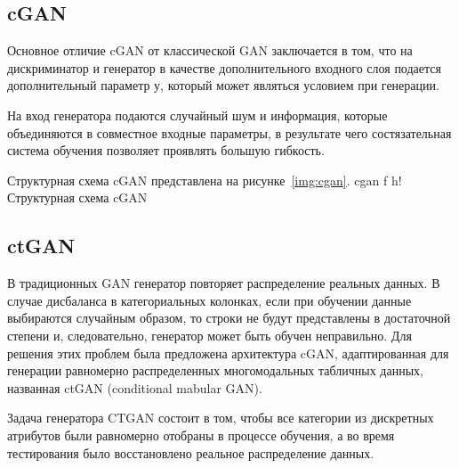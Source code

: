 \clearpage
\subsection{cGAN}

Основное отличие cGAN от классической GAN заключается в том, что на дискриминатор и генератор в качестве дополнительного входного слоя подается дополнительный параметр $у$, который может являться условием при генерации.


На вход генератора подаются случайный шум и информация, которые объединяются в совместное входные параметры, в результате чего состязательная система обучения позволяет проявлять большую гибкость.

Структурная схема cGAN представлена на рисунке~\ref{img:cgan}.
{cgan} %
{f} %
{h!} %
{\textwidth} %
{Структурная схема cGAN } %


\subsection{ctGAN}

В традиционных GAN генератор повторяет распределение реальных данных.
В случае дисбаланса в категориальных колонках, если при обучении данные выбираются случайным образом, то строки не будут представлены в достаточной степени и, следовательно, генератор может быть обучен неправильно.
Для решения этих проблем была предложена архитектура cGAN, адаптированная для генерации равномерно распределенных многомодальных табличных данных, названная ctGAN (conditional mabular GAN).

Задача генератора CTGAN состоит в том, чтобы все категории из дискретных атрибутов были равномерно отобраны в процессе обучения, а во время тестирования было восстановлено реальное распределение данных.

